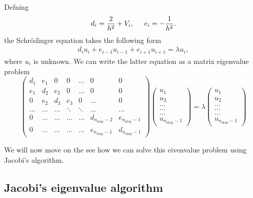 \documentclass[11pt,a4paper,english,draft]{article}
\numberwithin{equation}{section}
\begin{document}
Defning 
\begin{gather}
   d_i=\frac{2}{h^2}+V_i, \hspace{0.5cm } e_i=-\frac{1}{h^2}.
\end{gather}
the Schrödinger equation takes the following form
\begin{gather}
d_iu_i+e_{i-1}u_{i-1}+e_{i+1}u_{i+1}  = \lambda u_i,
\end{gather}
where $u_i$ is unknown. We can write the 
latter equation as a matrix eigenvalue problem 
\begin{equation}
\begin{pmatrix} d_1 & e_1 & 0   & 0    & \dots  &0     & 0 \\
                e_1 & d_2 & e_2 & 0    & \dots  &0     &0 \\
                0   & e_2 & d_3 & e_3  &0       &\dots & 0\\
        \dots  & \dots & \dots & \ddots  &\ddots      &\dots & \dots\\
 0   & \dots & \dots & \dots  &\dots  &d_{n_{\mathrm{step}}-2} & e_{n_{\mathrm{step}}-1}\\
 0   & \dots & \dots & \dots  &\dots       &e_{n_{\mathrm{step}}-1} & d_{n_{\mathrm{step}}-1}
             \end{pmatrix}
\begin{pmatrix} u_{1} \\
      u_{2} \\
      \dots\\ \dots\\ \dots\\
      u_{n_{\mathrm{step}}-1}
\end{pmatrix} 
= \lambda \begin{pmatrix} u_{1} \\
                          u_{2} \\
                          \dots\\ \dots\\ \dots\\
                          u_{n_{\mathrm{step}}-1}
             \end{pmatrix} 
      \label{eq:sematrix}
\end{equation} 

We will now move on the see how we can solve this eivenvalue problem using Jacobi's algorithm. 
 
\subsection{Jacobi's eigenvalue algorithm}
\end{document}
